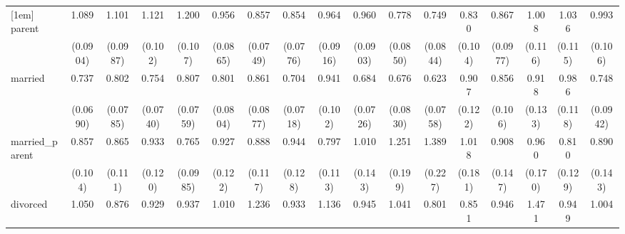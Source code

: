 {\begin{tabular}{l*{16}{c}}
[1em]
parent              &       1.089         &       1.101         &       1.121         &       1.200\sym{*}  &       0.956         &       0.857         &       0.854         &       0.964         &       0.960         &       0.778\sym{*}  &       0.749\sym{*}  &       0.830         &       0.867         &       1.008         &       1.036         &       0.993         \\
                    &    (0.0904)         &    (0.0987)         &     (0.102)         &     (0.107)         &    (0.0865)         &    (0.0749)         &    (0.0776)         &    (0.0916)         &    (0.0903)         &    (0.0850)         &    (0.0844)         &     (0.104)         &    (0.0977)         &     (0.116)         &     (0.115)         &     (0.106)         \\
[1em]
married             &       0.737\sym{**} &       0.802\sym{*}  &       0.754\sym{**} &       0.807\sym{*}  &       0.801\sym{*}  &       0.861         &       0.704\sym{***}&       0.941         &       0.684\sym{***}&       0.676\sym{**} &       0.623\sym{***}&       0.907         &       0.856         &       0.918         &       0.986         &       0.748\sym{*}  \\
                    &    (0.0690)         &    (0.0785)         &    (0.0740)         &    (0.0759)         &    (0.0804)         &    (0.0877)         &    (0.0718)         &     (0.102)         &    (0.0726)         &    (0.0830)         &    (0.0758)         &     (0.122)         &     (0.106)         &     (0.133)         &     (0.118)         &    (0.0942)         \\
[1em]
married\_parent      &       0.857         &       0.865         &       0.933         &       0.765\sym{*}  &       0.927         &       0.888         &       0.944         &       0.797         &       1.010         &       1.251         &       1.389\sym{*}  &       1.018         &       0.908         &       0.960         &       0.810         &       0.890         \\
                    &     (0.104)         &     (0.111)         &     (0.120)         &    (0.0985)         &     (0.122)         &     (0.117)         &     (0.128)         &     (0.113)         &     (0.143)         &     (0.199)         &     (0.227)         &     (0.181)         &     (0.147)         &     (0.170)         &     (0.129)         &     (0.143)         \\
[1em]
divorced            &       1.050         &       0.876         &       0.929         &       0.937         &       1.010         &       1.236         &       0.933         &       1.136         &       0.945         &       1.041         &       0.801         &       0.851         &       0.946         &       1.471\sym{**} &       0.949         &       1.004         \\

\end{tabular}}
